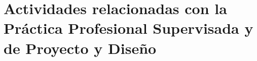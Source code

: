 

\chapter{Actividades relacionadas con la Práctica Profesional Supervisada y de Proyecto y Diseño}
\label{ap1}
\iffalse

\graphicspath{{figs/}}

\section{Práctica profesional supervisada}

\section{Proyecto y diseño}

Las actividades de proyecto y diseño (PyD) realizadas para llevar a cabo el presente Proyecto Integrador de la carrera Ingeniería Nuclear fueron:
\begin{enumerate}
	\item Caracterización del diseño del SABR, desarrollada en el capítulo \ref{}.
	\item Validación del código OpenMC, detallada en el capítulo \ref{}.
	\item Cálculo del término fuente de neutrones debido a las reacciones de fusión, especificado en el capítulo \ref{}.
	\item Muestreo de la fuente externa de neutrones, indicado en el capítuo \ref{}.
	\item Cálculo neutrónico del reactor híbrido fusión-fisión, especificado en el capítulo \ref{}.
\end{enumerate}
\fi
